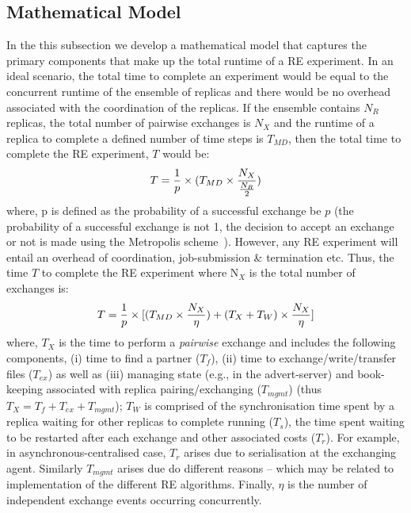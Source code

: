 \documentclass{rspublic}
\newcommand{\alnote}[1]{ {\textcolor{blue} { ***andre: #1 }}}
\newcommand{\alnote}[1]{}
\begin{document}
\subsection{Mathematical Model}
\label{sec:math-model}
In the this subsection we develop a mathematical model that captures
the primary components that make up the total runtime of a RE
experiment. In an ideal scenario, the total time to complete an
experiment would be equal to the concurrent runtime of the ensemble of
replicas and there would be no overhead associated with the
coordination of the replicas.  If the ensemble contains $N_R$
replicas, the total number of pairwise exchanges is $N_X$ and the
runtime of a replica to complete a defined number of time steps is
$T_{MD}$, then the total time to complete the RE experiment, $T$ would
be:
\begin{eqnarray}
T = {1\over p} \times (T_{MD} \times  {N_X \over {N_R \over 2}}) 
\label{eq:totaltime}
\end{eqnarray}
where, p is defined as the probability of a successful exchange be $p$
(the probability of a successful exchange is not 1, the
decision to accept an exchange or not is made using the
Metropolis scheme~\citep{metropolis:1087}). However, any RE experiment will entail an overhead
of coordination, job-submission \& termination etc. Thus, the time $T$
to complete the RE experiment where N$_X$ is the total number of
exchanges is:
\begin{eqnarray}
  T = {1\over p} \times [(T_{MD} \times  {N_X \over {\eta}}) +
  {(T_{X} + T_{W})} \times {N_X \over \eta}]
\label{eq:totaltime}
\end{eqnarray}
where, $T_{X}$ is the time to perform a {\it pairwise} exchange and
includes the following components, (i) time to find a partner ($T_f$),
(ii) time to exchange/write/transfer files ($T_{ex}$) as well as (iii)
managing state (e.g., in the advert-server) and book-keeping
associated with replica pairing/exchanging ($T_{mgmt}$) (thus $T_{X} =
T_{f} + T_{ex}+T_{mgmt}$); $T_W$ is comprised of the synchronisation
time spent by a replica waiting for other replicas to complete running
($T_s$), the time spent waiting to be restarted after each exchange
and other associated costs ($T_r$). For example, in
asynchronous-centralised case, $T_r$ arises due to serialisation at
the exchanging agent.  Similarly $T_{mgmt}$ arises due do different
reasons -- which may be related to
implementation %
of the different RE algorithms. Finally, $\eta$ is the number of
independent exchange events occurring concurrently.
\end{document}
